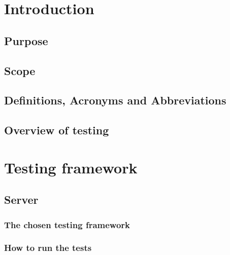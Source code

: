 \documentclass[a4paper,12pt]{article}
\begin{document}
    \tableofcontents
    
    \section{Introduction}
    	
        \subsection{Purpose}
        
        \subsection{Scope}
        
        \subsection{Definitions, Acronyms and Abbreviations}
        
        \subsection{Overview of testing}
        
    \section{Testing framework}
    
    	\subsection{Server}
    	
	    	\subsubsection{The chosen testing framework}
	    	
	        \subsubsection{How to run the tests}
	        
\end{document}
